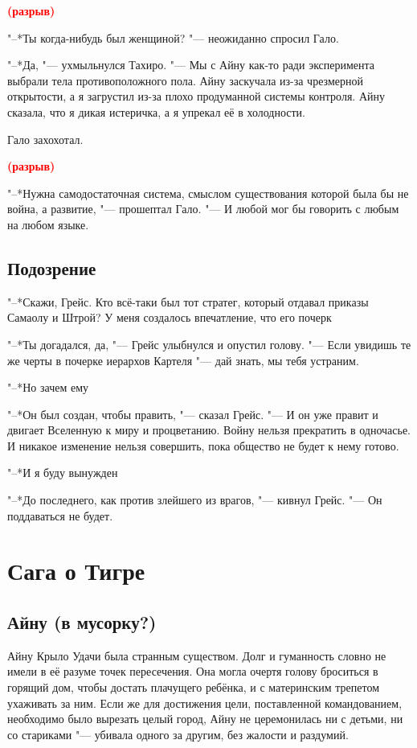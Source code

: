 \documentclass[a4paper,10pt,fleqn]{book}
\newcommand{\ldotst}{\so{...}\xspace}
\newcommand{\ldotsq}{\so{?\hbox{\hspace{-.212em}}..}\xspace}
\newcommand{\spacing}{\textcolor{red}{\textbf{(разрыв)}}}
\begin{document}
\spacing

"--*Ты когда-нибудь был женщиной? "--- неожиданно спросил Гало.

"--*Да, "--- ухмыльнулся Тахиро.
"--- Мы с Айну как-то ради эксперимента выбрали тела противоположного пола.
Айну заскучала из-за чрезмерной открытости, а я загрустил из-за плохо продуманной системы контроля.
Айну сказала, что я дикая истеричка, а я упрекал её в холодности.

Гало захохотал.

\spacing

"--*Нужна самодостаточная система, смыслом существования которой была бы не война, а развитие, "--- прошептал Гало.
"--- И любой мог бы говорить с любым на любом языке.

\section{Подозрение}

"--*Скажи, Грейс.
Кто всё-таки был тот стратег, который отдавал приказы Самаолу и Штрой?
У меня создалось впечатление, что его почерк\ldotst

"--*Ты догадался, да, "--- Грейс улыбнулся и опустил голову.
"--- Если увидишь те же черты в почерке иерархов Картеля "--- дай знать, мы тебя устраним.

"--*Но зачем ему\ldotsq

"--*Он был создан, чтобы править, "--- сказал Грейс.
"--- И он уже правит и двигает Вселенную к миру и процветанию.
Войну нельзя прекратить в одночасье.
И никакое изменение нельзя совершить, пока общество не будет к нему готово.

"--*И я буду вынужден\ldotst

"--*До последнего, как против злейшего из врагов, "--- кивнул Грейс.
"--- Он поддаваться не будет.

\chapter{Сага о Тигре}

\section{Айну (в мусорку?)}

Айну Крыло Удачи была странным существом.
Долг и гуманность словно не имели в её разуме точек пересечения.
Она могла очертя голову броситься в горящий дом, чтобы достать плачущего ребёнка, и с материнским трепетом ухаживать за ним.
Если же для достижения цели, поставленной командованием, необходимо было вырезать целый город, Айну не церемонилась ни с детьми, ни со стариками "--- убивала одного за другим, без жалости и раздумий.
\end{document}
